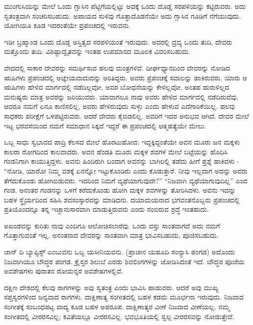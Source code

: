 ಮುಂಗುಸಿಯನ್ನು ಮೇಲೆ ಒಂದು ಗ್ಲಾಸಿನ ಪೆಟ್ಟಿಗೆಯಲ್ಲಿಟ್ಟು ಅದಕ್ಕೆ ಒಂದು ದೊಡ್ಡ ಸರಪಳಿಯನ್ನು ಕಟ್ಟಿರುವರು. ಅದು ಸ್ವತಂತ್ರವಾಗಿ ಸಂಚರಿಸಬಹುದು. ಅಪಾಯದ ಸುಳಿವು ಗೊತ್ತಾದೊಡನೆಯೇ ಅದು ಗ್ಲಾಸಿನ ಗೂಡಿಗೆ ನೆಗೆಯುವುದು. ಯೋಗಿಯೂ ಕೂಡ ಇದರಂತೆಯೇ ಪ್ರಪಂಚದಲ್ಲಿ ಇರುವನು.

ಇಡೀ ಬ್ರಹ್ಮಾಂಡ ಒಂದು ದೊಡ್ಡ ಅಸ್ತಿತ್ವದ ಸರಪಳಿಯಂತೆ ಇರುವುದು. ಅದರಲ್ಲಿ ದ್ರವ್ಯ  ಒಂದು ತುದಿ, ದೇವರು ಮತ್ತೊಂದು ತುದಿ. ವಿಶಿಷ್ಟಾದ್ವೈತವನ್ನು ಇಂತಹ ಉಪಮಾನದ ಮೂಲಕ ವಿವರಿಸಬಹುದು.

ವೇದದಲ್ಲಿ ಸಾಕಾರ ದೇವರನ್ನು ಸಮರ್ಥಿಸುವ ಹಲವು ಮಂತ್ರಗಳಿವೆ. ದೀರ್ಘಧ್ಯಾನದಿಂದ ದೇವರನ್ನು ನೋಡಿದ ಋಷಿಗಳು ಪ್ರಪಂಚದಲ್ಲಿ ಅಜ್ಞೇಯವಾದುದನ್ನು ಅರಿತಿದ್ದರು. ಅವರು ಪ್ರಪಂಚಕ್ಕೆ ಸವಾಲನ್ನು ಹಾಕಿರುವರು. ಯಾರು ಆ ಋಷಿಗಳು ಹೇಳಿದ ಮಾರ್ಗದಲ್ಲಿ ನಡೆದಿಲ್ಲವೋ, ಅವರ ಬೋಧನೆಯನ್ನು ಕೇಳಿಲ್ಲವೋ, ಅಂತಹ ಹುರುಳಿಲ್ಲದ ಮನುಷ್ಯರು ಮಾತ್ರ ಅವರನ್ನು ಜರಿಯುವರು. ಯಾವಾಗಲೂ ನಾವು ಅವರು ಹೇಳಿದ ಮಾರ್ಗದಲ್ಲಿ ನಡೆದಿರುವೆವು. ಆದರೂ ನಮಗೆ ಏನೂ ಕಾಣಿಸಲಿಲ್ಲ, ಅವರು ಹೇಳಿರುವುದು ಸುಳ್ಳು ಎಂದು ಹೇಳುವ ಎದೆಗಾರಿಕೆಯಿಲ್ಲ. ಹಲವು ಸಾಧಕರು ಪರೀಕ್ಷೆಗೆ ಒಳಪಟ್ಟಿರುವರು. ಆದರೆ ದೇವರು ಕೈಬಿಡಲಿಲ್ಲ. ಅವರಿಗೆ ಇದರ ಅನುಭವ ಆಗಿದೆ. ದೇವರ ಮೇಲೆ ಇಟ್ಟ ಭರವಸೆಯಿಂದ ನಮಗೆ ಸಮಾಧಾನ ಸಿಕ್ಕದೆ ಇದ್ದರೆ ಈ ಪ್ರಪಂಚದಲ್ಲಿ ಆತ್ಮಹತ್ಯೆಯೇ ಮೇಲು.

ಒಬ್ಬ ಸಾಧು ಸ್ವಭಾವದ ಪಾದ್ರಿ ಕೆಲಸದ ಮೇಲೆ ಹೊರಟುಹೋದ: ಇದ್ದಕ್ಕಿದ್ದಂತೆಯೇ ಅವನ ಮೂರು ಜನ ಮಕ್ಕಳು ಕಾಲರಾ ರೋಗದಿಂದ ಕಾಲವಾದರು. ಅವನ ಹೆಂಡತಿ ಮೂರು ಮಕ್ಕಳ ಶವಗಳ ಮೇಲೆ ಬಟ್ಟೆಯನ್ನು ಹೊದಿಸಿ ಗಂಡನಿಗಾಗಿ ಕಾಯುತ್ತಿದ್ದಳು. ಅವನು ಹಿಂದಿರುಗಿ ಬಂದಾಗ ಅವನನ್ನು ಬಾಗಿಲಲ್ಲಿ ತಡೆದು ಹೀಗೆ ಪ್ರಶ್ನೆ ಹಾಕಿದಳು - “ನೋಡಿ, ಯಾರೋ ನಿಮ್ಮ ವಶಕ್ಕೆ ಏನನ್ನೋ ಇಟ್ಟುಕೊಂಡಿರು ಎಂದು ಕೊಡುತ್ತಾರೆ. ನೀವು ಇಲ್ಲದಾಗ ಅದನ್ನು ಅವರು ತೆಗೆದುಕೊಂಡು ಹೋಗಿಬಿಡುವರು. ಇದರಿಂದ ನಿಮಗೆ ವ್ಯಥೆಯಾಗುವುದೇ?” “ನಿಜವಾಗಿ ವ್ಯಥೆಯಾಗುವುದಿಲ್ಲ” ಎಂದ ಗಂಡ. ಅನಂತರ ಗಂಡನನ್ನು ಒಳಗೆ ಕರೆದುಕೊಂಡು ಹೋಗಿ ಮಕ್ಕಳ ಶವಗಳನ್ನು ತೋರಿಸಿದಳು. ಅವನು ಇದನ್ನು ಬಹಳ ಸ್ಥೈರ್ಯದಿಂದ ಸಹಿಸಿ ಶವಸಂಸ್ಕಾರವನ್ನು ಮಾಡಿದನು. ದಯಾಮಯನಾದ ಭಗವಂತನೊಬ್ಬನು ಪ್ರಪಂಚದಲ್ಲಿ ಪ್ರತಿಯೊಂದನ್ನೂ ತನ್ನ ಇಚ್ಛಾನುಸಾರವಾಗಿ ಮಾಡುತ್ತಿರುವನು ಎಂದು ನಂಬಿರುವ ಶ್ರದ್ಧೆ ಇಂತಹುದು.

ಅಖಂಡವನ್ನು ಕುರಿತು ನಾವು ಎಂದಿಗೂ ಆಲೋಚಿಸಲಾರೆವು. ಒಂದು ವಸ್ತು ಸಾಂತವಾಗದೆ ಅದು ನಮಗೆ ಗೊತ್ತಾಗುವಂತೆ ಇಲ್ಲ. ಅನಂತನಾದ ದೇವರನ್ನು ಸಾಂತವಾಗಿ ಮಾತ್ರ ಭಾವಿಸಬಹುದು, ಪೂಜಿಸಬಹುದು.

ಜಾನ್ ದಿ ಬ್ಯಾಪ್ಟಿಸ್ಟ್ ಎಂಬುವನು ಒಬ್ಬ ಯಸೀನಿಯವನು. (ಪ್ರಾಚೀನ ಯಹೂದಿ ಸಂನ್ಯಾಸಿ ಪಂಗಡ) ಅದೊಂದು ನಿಜವಾಗಿಯೂ ಬೌದ್ಧರ ಪಂಗಡ. ಕ್ರೈಸ್ತರ ಶಿಲುಬೆ ಎರಡು ಶಿವಲಿಂಗಗಳನ್ನು ಜೋಡಿಸಿದಂತೆ ಇದೆ. ಬೌದ್ಧರ ಪೂಜೆಯ ಅವಶೇಷಗಳು ಪುರಾತನ ರೋಮನ್ನರ ಅವಶೇಷಗಳಲ್ಲಿವೆ.

ದಕ್ಷಿಣ ದೇಶದಲ್ಲಿ ಕೆಲವು ರಾಗಗಳನ್ನು ಅವು ಸ್ವತಂತ್ರ ಎಂದು ಭಾವಿಸಿ ಹಾಡುವರು. ಆದರೆ ಅವು ಮುಖ್ಯ ಸಪ್ತಸ್ವರಗಳಿಂದ ಜನ್ಯವಾದ ರಾಗಗಳು. ದಾಕ್ಷಿಣಾತ್ಯ ಸಂಗೀತದಲ್ಲಿ ಬಹಳ ಕಡಮೆ ಮೂರ್ಛನಾ ಇರುವುದು. ನಿಜವಾದ ಸಂಗೀತಕ್ಕೆ ಸಂಬಂಧಪಟ್ಟ ವಾದ್ಯ ಕೂಡ ಬಹಳ ಅಪರೂಪ. ದಾಕ್ಷಿಣಾತ್ಯರ ವೀಣೆ ನಿಜವಾದ ವೀಣೆಯಲ್ಲ. ನಮ್ಮ ಸಂಗೀತದಲ್ಲಿ ವೀರರಸವಿಲ್ಲ; ಕವಿತೆಯಲ್ಲೂ ವೀರರಸವಿಲ್ಲ. ಭವಭೂತಿಯಲ್ಲಿ ಸ್ವಲ್ಪ ವೀರರಸವನ್ನು ನೋಡುತ್ತೇವೆ.

\delimiter

